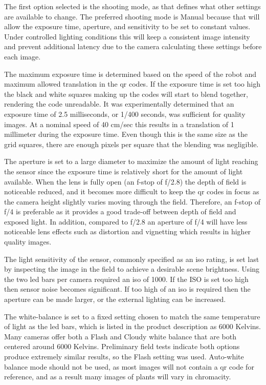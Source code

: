 The first option selected is the shooting mode, as that defines what other settings are available to change.  The preferred shooting mode is Manual because that will allow the exposure time, aperture, and sensitivity to be set to constant values.  Under controlled lighting conditions this will keep a consistent image intensity and prevent additional latency due to the camera calculating these settings before each image.

The maximum exposure time is determined based on the speed of the robot and maximum allowed translation in the \ac{qr} codes.  If the exposure time is set too high the black and white squares making up the codes will start to blend together, rendering the code unreadable.  It was experimentally determined that an exposure time of 2.5 milliseconds, or 1/400 seconds, was sufficient for quality images.  At a nominal speed of 40 cm/sec this results in a translation of 1 millimeter during the exposure time.  Even though this is the same size as the grid squares, there are enough pixels per square that the blending was negligible. 

The aperture is set to a large diameter to maximize the amount of light reaching the sensor since the exposure time is relatively short for the amount of light available.  When the lens is fully open (an f-stop of f/2.8) the depth of field is noticeable reduced, and it becomes more difficult to keep the \ac{qr} codes in focus as the camera height slightly varies moving through the field.  Therefore, an f-stop of f/4 is preferable as it provides a good trade-off between depth of field and exposed light.  In addition, compared to f/2.8 an aperture of f/4 will have less noticeable lens effects such as distortion and vignetting which results in higher quality images.  

The light sensitivity of the sensor, commonly specified as an \ac{iso} rating, is set last by inspecting the image in the field to achieve a desirable scene brightness.  Using the two \ac{led} bars per camera required an \ac{iso} of 1000.  If the ISO is set too high then sensor noise becomes significant.  If too high of an \ac{iso} is required then the aperture can be made larger, or the external lighting can be increased.  

The white-balance is set to a fixed setting chosen to match the same temperature of light as the \ac{led} bars, which is listed in the product description as 6000 Kelvins.  Many cameras offer both a Flash and Cloudy white balance that are both centered around 6000 Kelvins.   Preliminary field tests indicate both options produce extremely similar results, so the Flash setting was used.  Auto-white balance mode should not be used, as most images will not contain a \ac{qr} code for reference, and as a result many images of plants will vary in chromacity. 

